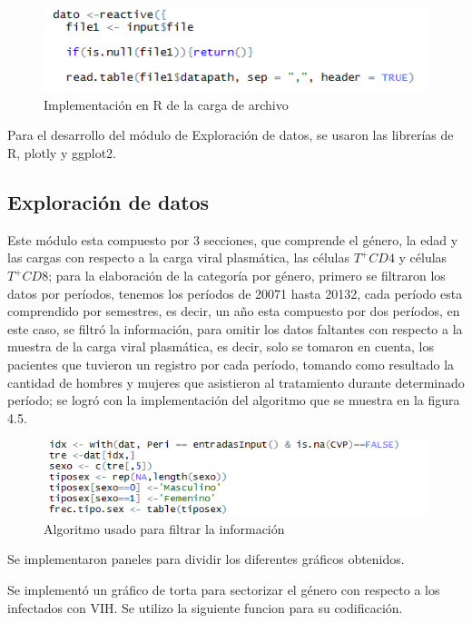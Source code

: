 \begin{figure}[H]
\centering
\includegraphics[scale=0.8]{archivo2.PNG}
\caption{Implementaci\'on en R de la carga de archivo}
\end{figure}

Para el desarrollo del m\'odulo de Exploraci\'on de datos, se usaron las librer\'ias de R, plotly y ggplot2.\\

\subsection{Exploraci\'on de datos}

Este m\'odulo esta compuesto por 3 secciones, que comprende el g\'enero, la edad y las cargas con respecto a la carga viral plasm\'atica, las c\'elulas $T^{+}CD4$ y c\'elulas $T^{+}CD8$; para la elaboraci\'on de la categor\'ia por g\'enero, primero se filtraron los datos por per\'iodos, tenemos los per\'iodos de 20071 hasta 20132, cada per\'iodo esta comprendido por semestres, es decir, un año esta compuesto por dos per\'iodos, en este caso, se filtr\'o la informaci\'on, para omitir los datos faltantes con respecto a la muestra de la carga viral plasm\'atica, es decir, solo se tomaron en cuenta, los pacientes que tuvieron un registro por cada per\'iodo, tomando como resultado la cantidad de hombres y mujeres que asistieron al tratamiento durante determinado per\'iodo; se logr\'o con la implementaci\'on del  algoritmo que se muestra en la figura 4.5. 

\begin{figure}[H]
\centering
\includegraphics[scale=1]{algoritmo.png}
\caption{Algoritmo usado para filtrar la informaci\'on}
\end{figure}

Se implementaron   paneles  para dividir los diferentes gr\'aficos obtenidos.

Se implement\'o un gr\'afico de torta para sectorizar el g\'enero con respecto a los infectados con VIH. Se utilizo la siguiente funcion para su codificaci\'on.


